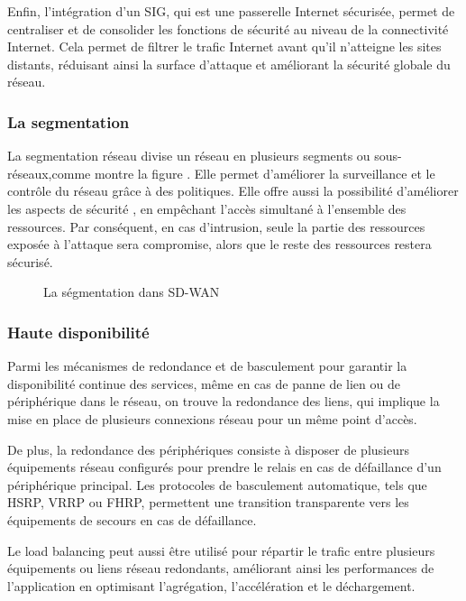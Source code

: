 Enfin, l'intégration d'un SIG, qui est une passerelle Internet sécurisée, permet de centraliser et de consolider les fonctions de sécurité au niveau de la connectivité Internet. Cela permet de filtrer le trafic Internet avant qu'il n'atteigne les sites distants, réduisant ainsi la surface d'attaque et améliorant la sécurité globale du réseau. 
\subsubsection{La segmentation }

La segmentation réseau divise un réseau en plusieurs segments ou sous-réseaux,comme montre la figure . Elle permet d'améliorer la surveillance et le contrôle du réseau grâce à des politiques. Elle offre aussi la possibilité d'améliorer les aspects de sécurité , en empêchant l'accès simultané à l'ensemble des ressources. Par conséquent, en cas d'intrusion, seule la partie des ressources exposée à l'attaque sera compromise, alors que le reste des ressources restera sécurisé.
\begin{figure} [H]
	
	\begin{center}
		\centering
		\hspace*{-0.5cm}
		
	\end{center}
	\caption{La ségmentation dans SD-WAN }
\end{figure} 
\subsubsection{Haute disponibilité  }

Parmi les mécanismes de redondance et de basculement pour garantir la disponibilité continue des services, même en cas de panne de lien ou de périphérique dans le réseau, on trouve la redondance des liens, qui implique la mise en place de plusieurs connexions réseau pour un même point d'accès. 


De plus, la redondance des périphériques consiste à disposer de plusieurs équipements réseau configurés pour prendre le relais en cas de défaillance d'un périphérique principal. 
Les protocoles de basculement automatique, tels que HSRP, VRRP ou FHRP, permettent une transition transparente vers les équipements de secours en cas de défaillance.


Le load balancing peut aussi être utilisé pour répartir le trafic entre plusieurs équipements ou liens réseau redondants, améliorant ainsi les performances de l'application en optimisant l'agrégation, l'accélération et le déchargement. 

